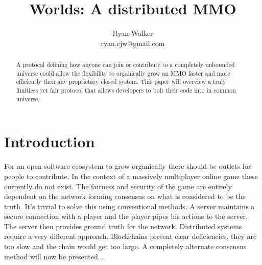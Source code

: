 \documentclass[runningheads,a4paper]{llncs}
\begin{document}
\def \SystemName {Worlds} %

\mainmatter  %

\title{\SystemName: A distributed MMO}

\author{Ryan Walker\\
				ryan.cjw@gmail.com}

\institute{} %

\maketitle


%  

\begin{abstract}
A protocol defining how anyone can join or contribute to a completely unbounded universe could allow the flexibility to organically grow an MMO faster and more efficiently then any proprietary closed system. This paper will overview a truly limitless yet fair protocol that allows developers to bolt their code into in common universe. 
\end{abstract}

\section{Introduction}
For an open software ecosystem to grow organically there should be outlets for people to contribute. In the context of a massively multiplayer online game these currently do not exist. The fairness and security of the game are entirely dependent on the network forming consensus on what is considered to be the truth. It's trivial to solve this using conventional methods. A server maintains a secure connection with a player and the player pipes his actions to the server. The server then provides ground truth for the network. Distributed systems require a very different approach. Blockchains present clear deficiencies, they are too slow and the chain would get too large. A completely alternate consensus method will now be presented...
\end{document}
